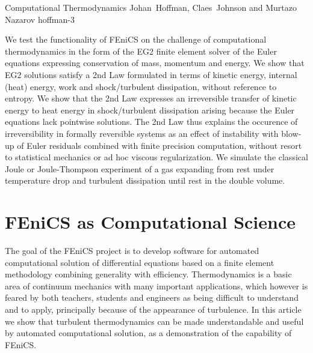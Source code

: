               {Computational Thermodynamics}
              {Johan~Hoffman, Claes~Johnson and Murtazo Nazarov}
              {hoffman-3}


\newcommand{\bbR}{{\Bbb{R}}}
\newcommand{\bbC}{{\Bbb{C}}}

We test the functionality of FEniCS on the challenge of computational
thermodynamics in the form
of the EG2 finite element solver of the Euler equations expressing conservation
of mass, momentum and energy. We show that EG2 solutions satisfy a 2nd
Law formulated
in terms of kinetic energy,  internal (heat) energy, work and shock/turbulent
dissipation,
without reference to entropy. We show that the 2nd Law
expresses an irreversible transfer of kinetic energy to heat energy in
shock/turbulent dissipation
arising because the Euler equations lack pointwise solutions.
The 2nd Law thus explains the occurence of irreversibility in formally
reversible systems
as an effect of instability with blow-up of Euler residuals combined with finite
precision
computation, without resort to statistical mechanics or ad hoc viscous
regularization.
We simulate the classical Joule or Joule-Thompson experiment
of a gas expanding from rest under temperature drop and turbulent dissipation
until rest in the double volume.

\section{FEniCS as Computational Science}

The goal of the FEniCS project is to develop software for automated
computational solution of differential equations based on
a finite element methodology combining generality with efficiency.
Thermodynamics is a basic area of continuum mechanics with many important
applications, which however is feared
by both teachers, students and engineers as being difficult to understand and to
apply, principally because of the
appearance of turbulence. In this article we show that turbulent thermodynamics
can be made understandable and useful by automated
computational solution, as a demonstration of the capability of FEniCS.

